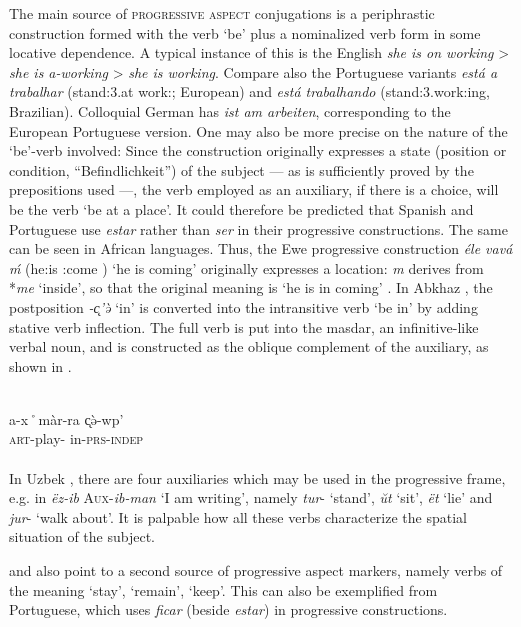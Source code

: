 \label{page33}The main source of \textsc{progressive aspect} conjugations is a periphrastic construction formed with the verb ‘be’ plus  a nominalized verb form in some locative dependence. A typical instance of this is the English \textit{she is on working} {\textgreater} \textit{she is a-working} {\textgreater} \textit{she is working}. Compare also the Portuguese variants \textit{está a trabalhar} (stand:3.\glsg at work:\glinf; European) and \textit{está trabalhando} (stand:3.\glsg work:ing, Brazilian). Colloquial German has \textit{ist am arbeiten}, corresponding to the European Portuguese version. One may also be more precise on the nature of the ‘be’-verb involved: Since the construction originally expresses a state (position or condition, ``Befindlichkeit'') of the subject — as is sufficiently proved by the prepositions used —, the verb employed as an auxiliary, if there is a choice, will be the verb ‘be at a place’. It could therefore be predicted that Spanish and Portuguese use \textit{estar} rather than \textit{ser} in their progressive constructions. The same can be seen in African languages. Thus, the Ewe progressive construction \textit{éle vavá \'m} (he:is \rdp:come \glprog) ‘he is coming’ originally expresses a location: \textit{m} derives from *\textit{me} ‘inside’, so that the original meaning is ‘he is in coming’ \citep[105f]{Heine1980}. In Abkhaz \citep[128, 181f]{Hewitt1979}, the postposition \textit{-\k{c}'\`ə} ‘in’ is converted into the intransitive verb ‘be in’ by adding stative verb inflection. The full verb is put into the masdar, an infinitive-like verbal noun, and is constructed as the oblique complement of the auxiliary, as shown in .

\ea\label{ex:E3} 
\\
 \gll a-x˚màr-ra  \k{c}\`ə-wp'\\
{\textsc{art}-play-\glinf}  in-\textsc{prs}-\textsc{indep}\\
\\
\z
\noindent In Uzbek \citep[86]{Žirmunskij1966}, there are four auxiliaries which may be used in the progressive frame, 
e.g. in \textit{ëz-ib} \textsc{Aux}{}-\textit{ib-man} ‘I am writing’, namely \textit{tur}{}- ‘stand’, \textit{\u{u}t} ‘sit’, \textit{ët }‘lie’ and \textit{jur}{}- ‘walk about’. It is palpable how all these verbs characterize the spatial situation of the subject.

\citet[§5]{Givón1973} and \citet[124--126]{HeineEtAl1984} also point to a second source of progressive aspect markers, namely verbs of the meaning ‘stay’, ‘remain’, ‘keep’. This can also be exemplified from Portuguese, which uses \textit{ficar} (beside \textit{estar}) in progressive constructions.

